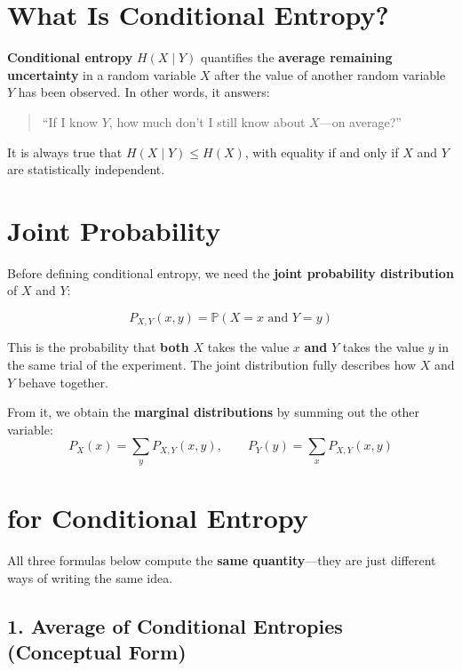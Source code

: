 \documentclass[11pt]{article}
\begin{document}
\section*{\texorpdfstring{\faLightbulb}{Intuition} What Is Conditional Entropy?}

\textbf{Conditional entropy} \(H(X \mid Y)\) quantifies the \textbf{average remaining uncertainty} in a random variable \(X\) after the value of another random variable \(Y\) has been observed. In other words, it answers:

\begin{quote}
``If I know \(Y\), how much don’t I still know about \(X\)—on average?''
\end{quote}

It is always true that \(H(X \mid Y) \leq H(X)\), with equality if and only if \(X\) and \(Y\) are statistically independent.

\section*{\texorpdfstring{\faKey}{Key Building Block} Joint Probability}

Before defining conditional entropy, we need the \textbf{joint probability distribution} of \(X\) and \(Y\):

\[
\boxed{P_{X,Y}(x, y) = \mathbb{P}(X = x \text{ and } Y = y)}
\]

This is the probability that \textbf{both} \(X\) takes the value \(x\) \textbf{and} \(Y\) takes the value \(y\) in the same trial of the experiment. The joint distribution fully describes how \(X\) and \(Y\) behave together.

From it, we obtain the \textbf{marginal distributions} by summing out the other variable:
\[
P_X(x) = \sum_{y} P_{X,Y}(x, y), \qquad
P_Y(y) = \sum_{x} P_{X,Y}(x, y)
\]

\section*{\texorpdfstring{\faRuler}{Three Equivalent Expressions} for Conditional Entropy}

All three formulas below compute the \textbf{same quantity}—they are just different ways of writing the same idea.

\subsection*{1. Average of Conditional Entropies (Conceptual Form)}
\end{document}
